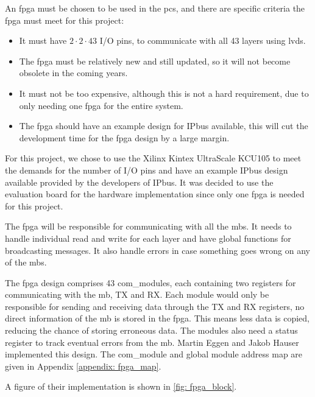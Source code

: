 \documentclass[main.tex]{subfiles}
\begin{document}
An \gls{fpga} must be chosen to be used in the \gls{pcs}, and there are specific criteria the \gls{fpga} must meet for this project:

\begin{itemize}
    \item It must have $2 \cdot 2 \cdot 43$ I/O pins, to communicate with all 43 layers using \acrshort{lvds}.
    \item The \gls{fpga} must be relatively new and still updated, so it will not become obsolete in the coming years.
    \item It must not be too expensive, although this is not a hard requirement, due to only needing one \gls{fpga} for the entire system.
    \item The \gls{fpga} should have an example design for IPbus available, this will cut the development time for the \gls{fpga} design by a large margin.
\end{itemize}

For this project, we chose to use the Xilinx Kintex UltraScale KCU105 to meet the demands for the number of I/O pins and have an example IPbus design available provided by the developers of IPbus. It was decided to use the evaluation board for the hardware implementation since only one \gls{fpga} is needed for this project.

The \gls{fpga} will be responsible for communicating with all the \gls{mb}s. It needs to handle individual read and write for each layer and have global functions for broadcasting messages. It also handle errors in case something goes wrong on any of the \gls{mb}s. 

The \gls{fpga} design comprises 43 com\_modules, each containing two registers for communicating with the \gls{mb}, TX and RX. Each module would only be responsible for sending and receiving data through the TX and RX registers, no direct information of the \gls{mb} is stored in the \gls{fpga}. This means less data is copied, reducing the chance of storing erroneous data. The modules also need a status register to track eventual errors from the \gls{mb}. Martin Eggen and Jakob Hauser implemented this design. The com\_module and global module address map are given in Appendix \ref{appendix: fpga_map}. 

A figure of their implementation is shown in \autoref{fig: fpga_block}.
\end{document}
